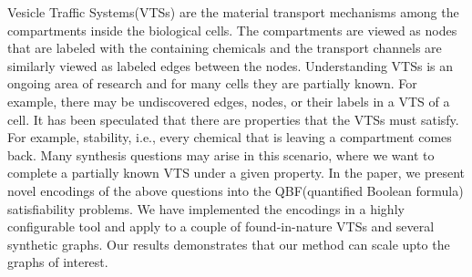 Vesicle Traffic Systems(VTSs) are the material transport mechanisms
among the compartments inside the biological cells.
%
The compartments are viewed as nodes that are labeled with the
containing chemicals and the transport channels
are similarly viewed as labeled edges between the nodes.
%
Understanding VTSs is an ongoing area of research and for many cells
they are partially known.
%
For example, there may be undiscovered edges, nodes, or their labels
in a VTS of a cell.
%
It has been speculated that there are properties that the VTSs must
satisfy.
%
For example, stability, i.e., every chemical that is leaving a
compartment comes back.
%
Many synthesis questions may arise in this scenario, where we want
to complete a partially known VTS under a given property.
%
In the paper, we present novel encodings of the above questions
into the QBF(quantified Boolean formula) satisfiability problems.
%
We have implemented the encodings in a highly configurable tool
and apply to a couple of found-in-nature VTSs and 
several synthetic graphs.
%
Our results demonstrates that our method can scale upto the
graphs of interest.
%

